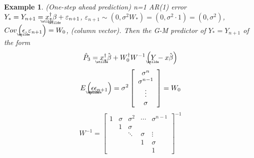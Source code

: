 \documentclass{article}
\newtheorem{example}[theorem]{Example}
\begin{document}
\begin{example}
(One-step ahead prediction) n=1 AR(1) error $Y_{\ast }=Y_{n+1}=%
\underaccent{\wtilde}{x}%
_{\ast }^{\dagger }%
\underaccent{\wtilde}{\beta}%
+\varepsilon _{n+1}$, $\varepsilon _{n+1}\sim \left( 0,\sigma ^{2}W_{\ast
}\right) =\left( 0,\sigma ^{2}\cdot 1\right) =\left( 0,\sigma ^{2}\right) $, 
$Cov\left( 
\underaccent{\wtilde}{\epsilon}%
,\varepsilon _{n+1}\right) =W_{0}$, (column vector). \newline
Then the G-M predictor of $Y_{\ast }=Y_{n+1}$ of the form%
\begin{equation*}
\hat{P}_{3}=%
\underaccent{\wtilde}{x}%
_{\ast }^{\dagger }\hat{\beta}+W_{0}^{\dagger }W^{-1}\left( 
\underaccent{\wtilde}{Y}%
-x\hat{\beta}\right) 
\end{equation*}%
\begin{equation*}
E\left( 
\underaccent{\wtilde}{\epsilon}%
\underaccent{\wtilde}{\epsilon}%
_{n+1}\right) =\sigma ^{2}\left[ 
\begin{array}{c}
\sigma ^{n} \\ 
\sigma ^{n-1} \\ 
\vdots  \\ 
\sigma 
\end{array}%
\right] =W_{0}
\end{equation*}%
\begin{equation*}
W^{-1}=\left[ 
\begin{array}{ccccc}
1 & \sigma  & \sigma ^{2} & \cdots  & \sigma ^{n-1} \\ 
& 1 & \sigma  &  &  \\ 
&  & \ddots  & \sigma  & \vdots  \\ 
&  &  & 1 & \sigma  \\ 
&  &  &  & 1%
\end{array}%
\right] ^{-1}
\end{equation*}
\end{example}
\end{document}
